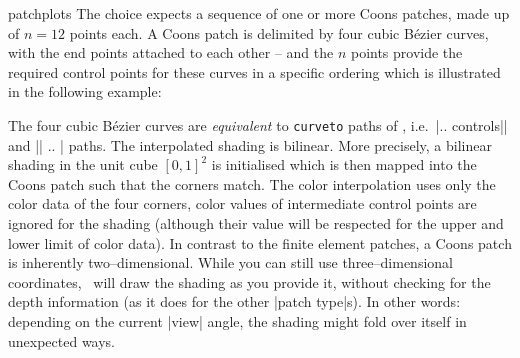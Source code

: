 {\begin{pgfplotslibrary}{patchplots}
	The choice  expects a sequence of one or more Coons patches, made up of $n=12$ points each. A Coons patch is delimited by four cubic B\'ezier curves, with the end points attached to each other -- and the $n$ points provide the required control points for these curves in a specific ordering which is illustrated in the following example:
\begin{codeexample}[]
\end{codeexample}
	\noindent The four cubic B\'ezier curves are \emph{equivalent} to \texttt{curveto} paths of \pgfname, i.e.\  |.. controls|| and || .. | paths. The interpolated shading is bilinear. More precisely, a bilinear shading in the unit cube $[0,1]^2$ is initialised which is then mapped into the Coons patch such that the corners match. The color interpolation uses only the color data of the four corners, color values of intermediate control points are ignored for the shading (although their value will be respected for the upper and lower limit of color data). In contrast to the finite element patches, a Coons patch is inherently two--dimensional. While you can still use three--dimensional coordinates, \PGFPlots\ will draw the shading as you provide it, without checking for the depth information (as it does for the other |patch type|s). In other words: depending on the current |view| angle, the shading might fold over itself in unexpected ways.


\end{pgfplotslibrary}}
